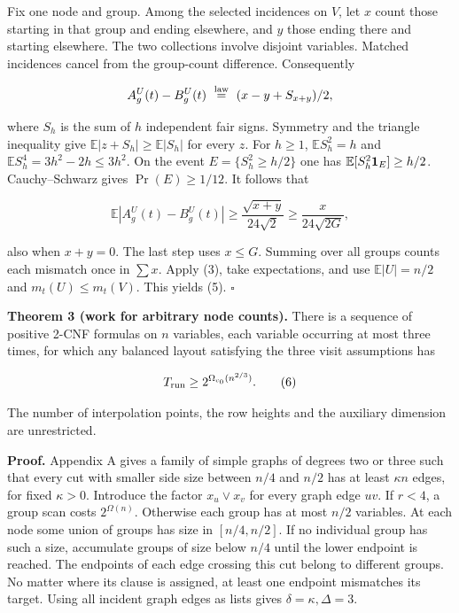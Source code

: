 \documentclass[
  10pt,
]{article}
\begin{document}
Fix one node and group. Among the selected incidences on \(V\), let
\(x\) count those starting in that group and ending elsewhere, and \(y\)
those ending there and starting elsewhere. The two collections involve
disjoint variables. Matched incidences cancel from the group-count
difference. Consequently

\[
 A_g^U(t)-B_g^U(t)\ \stackrel{\rm law}{=}\ (x-y+S_{x+y})/2 ,
\]

where \(S_h\) is the sum of \(h\) independent fair signs. Symmetry and
the triangle inequality give \(\mathbb E|z+S_h|\ge\mathbb E|S_h|\) for
every \(z\). For \(h\ge1\), \(\mathbb E S_h^2=h\) and
\(\mathbb E S_h^4=3h^2-2h\le3h^2\). On the event \(E=\{S_h^2\ge h/2\}\)
one has \(\mathbb E[S_h^2{\bf1}_E]\ge h/2\). Cauchy--Schwarz gives
\(\Pr(E)\ge1/12\). It follows that

\[
 \mathbb E|A_g^U(t)-B_g^U(t)|
     \ge\frac{\sqrt{x+y}}{24\sqrt2}
     \ge\frac{x}{24\sqrt{2G}} ,
\]

also when \(x+y=0\). The last step uses \(x\le G\). Summing over all
groups counts each mismatch once in \(\sum x\). Apply (3), take
expectations, and use \(\mathbb E|U|=n/2\) and \(m_t(U)\le m_t(V)\).
This yields (5). \(\square\)

\textbf{Theorem 3 (work for arbitrary node counts).} There is a sequence
of positive 2-CNF formulas on \(n\) variables, each variable occurring
at most three times, for which any balanced layout satisfying the three
visit assumptions has

\[
                        T_{\rm run}\ge 2^{\Omega_{c_0}(n^{2/3})}.       \tag{6}
\]

The number of interpolation points, the row heights and the auxiliary
dimension are unrestricted.

\textbf{Proof.} Appendix A gives a family of simple graphs of degrees
two or three such that every cut with smaller side size between \(n/4\)
and \(n/2\) has at least \(\kappa n\) edges, for fixed \(\kappa>0\).
Introduce the factor \(x_u\lor x_v\) for every graph edge \(uv\). If
\(r<4\), a group scan costs \(2^{\Omega(n)}\). Otherwise each group has
at most \(n/2\) variables. At each node some union of groups has size in
\([n/4,n/2]\). If no individual group has such a size, accumulate groups
of size below \(n/4\) until the lower endpoint is reached. The endpoints
of each edge crossing this cut belong to different groups. No matter
where its clause is assigned, at least one endpoint mismatches its
target. Using all incident graph edges as lists gives
\(\delta=\kappa,\Delta=3\).
\end{document}
